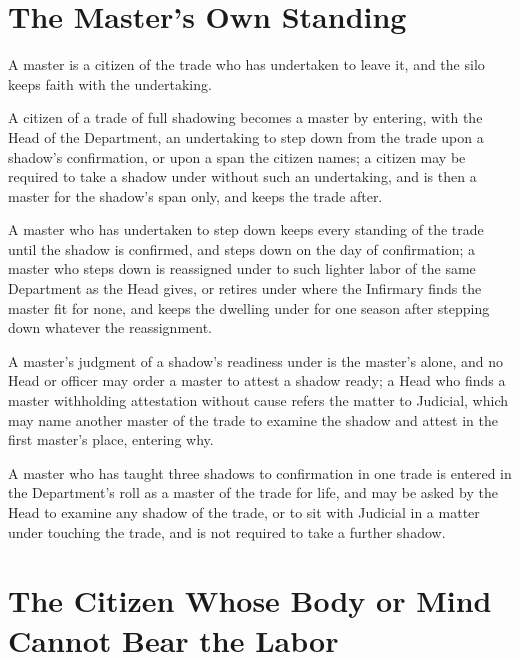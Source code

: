 \section{The Master's Own Standing}
\label{sec:labor:masters-own-standing}

A master is a citizen of the trade who has undertaken to leave it, and the silo keeps faith with the undertaking.

\begin{clauses}
\item A citizen of a trade of full shadowing becomes a master by entering, with the Head of the Department, an undertaking to step down from the trade upon a shadow's confirmation, or upon a span the citizen names; a citizen may be required to take a shadow under  without such an undertaking, and is then a master for the shadow's span only, and keeps the trade after.
\item A master who has undertaken to step down keeps every standing of the trade until the shadow is confirmed, and steps down on the day of confirmation; a master who steps down is reassigned under  to such lighter labor of the same Department as the Head gives, or retires under  where the Infirmary finds the master fit for none, and keeps the dwelling under  for one season after stepping down whatever the reassignment.
\item A master's judgment of a shadow's readiness under  is the master's alone, and no Head or officer may order a master to attest a shadow ready; a Head who finds a master withholding attestation without cause refers the matter to Judicial, which may name another master of the trade to examine the shadow and attest in the first master's place, entering why.
\item A master who has taught three shadows to confirmation in one trade is entered in the Department's roll as a master of the trade for life, and may be asked by the Head to examine any shadow of the trade, or to sit with Judicial in a matter under  touching the trade, and is not required to take a further shadow.
\end{clauses}

\section{The Citizen Whose Body or Mind Cannot Bear the Labor}
\label{sec:labor:citizen-who-cannot-bear-the-labor}

